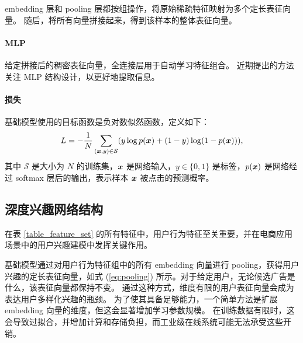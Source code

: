 embedding 层和 pooling 层都按组操作，将原始稀疏特征映射为多个定长表征向量。
随后，将所有向量拼接起来，得到该样本的整体表征向量。

\paragraph{\textbf{MLP}} 给定拼接后的稠密表征向量，全连接层用于自动学习特征组合。
近期提出的方法 \cite{widedeep,DeepFM,PNN} 关注 MLP 结构设计，以更好地提取信息。\par
\paragraph{\textbf{损失}}基础模型使用的目标函数是负对数似然函数，定义如下：
\begin{equation}
    L= - \frac{1}{N} \sum_{(\boldsymbol{x},y)\in\mathcal{S}} (y\log p(\boldsymbol{x}) + (1-y)\log(1-p(\boldsymbol{x}))),
\end{equation}
其中 $\mathcal{S}$ 是大小为 $N$ 的训练集，$\boldsymbol{x}$ 是网络输入，$y\in \{0,1\}$ 是标签，$p(\boldsymbol{x})$ 是网络经过 softmax 层后的输出，表示样本 $\boldsymbol{x}$ 被点击的预测概率。


\subsection{深度兴趣网络结构}

在表 \ref{table_feature_set} 的所有特征中，用户行为特征至关重要，并在电商应用场景中的用户兴趣建模中发挥关键作用。

基础模型通过对用户行为特征组中的所有 embedding 向量进行 pooling，获得用户兴趣的定长表征向量，如式 (\ref{eq:pooling}) 所示。对于给定用户，无论候选广告是什么，该表征向量都保持不变。
通过这种方式，维度有限的用户表征向量会成为表达用户多样化兴趣的瓶颈。
为了使其具备足够能力，一个简单方法是扩展 embedding 向量的维度，但这会显著增加学习参数规模。
在训练数据有限时，这会导致过拟合，并增加计算和存储负担，而工业级在线系统可能无法承受这些开销。



